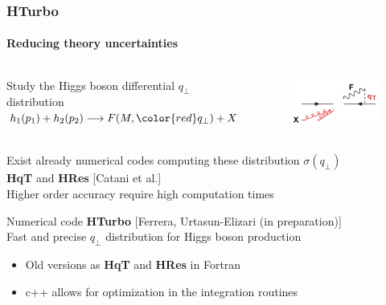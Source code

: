 \documentclass[aspectratio=43]{beamer}
\begin{document}
\begin{frame}
	
	\frametitle{HTurbo}
	\framesubtitle{Reducing theory uncertainties}
	
	\begin{columns}
		
		
		\center	\footnotesize Study the Higgs boson differential $q_{\perp}$ distribution \\
		\center	$h_{1}(p_{1}) + h_{2}(p_{2}) \longrightarrow F(M, {\color{red}q_{\perp}}) + X$
		
		
		\begin{figure}
			\includegraphics[width = 3.5cm]{plots/section2/qT_diagram.png}
		\end{figure}
		
	\end{columns}
	
	\vspace{0.5cm}
	
	\footnotesize Exist already numerical codes computing these distribution $\sigma(q_{\perp})$ \\ \textbf{HqT} and \textbf{HRes} {\color{blue}[Catani et al.]} \\
	\footnotesize Higher order accuracy require {\color{red}high computation times}

	\vspace{0.5cm}
		
	\footnotesize Numerical code \textbf{HTurbo} {\color{blue}[Ferrera, Urtasun-Elizari (in preparation)]} \\
	Fast and precise $q_{\perp}$ distribution for Higgs boson production
	
	\begin{itemize}
		\item \footnotesize Old versions as \textbf{HqT} and \textbf{HRes} in Fortran
		\item \footnotesize c++ allows for optimization in the integration routines
	\end{itemize}

\end{frame}
\end{document}
